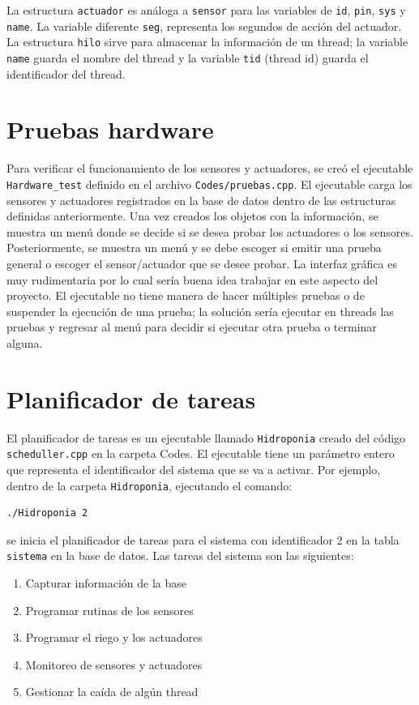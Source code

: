 \documentclass[a4paper,10pt,titlepage]{article}
\begin{document}
La estructura \verb|actuador| 
es an\'aloga a \verb|sensor| para las variables de \verb|id|, \verb|pin|, \verb|sys| y \verb|name|. La variable diferente \verb|seg|, representa los segundos de acci\'on 
del actuador. La estructura \verb|hilo| sirve para almacenar la informaci\'on de un thread; la variable \verb|name| guarda el nombre del thread y la variable \verb|tid| 
(thread id) guarda el identificador del thread.

\section{Pruebas hardware}
Para verificar el funcionamiento de los sensores y actuadores, se cre\'o el ejecutable \verb|Hardware_test| definido en el archivo \verb|Codes/pruebas.cpp|. El ejecutable 
carga 
los sensores y actuadores registrados en la base de datos dentro de las estructuras definidas anteriormente. Una vez creados los objetos con la informaci\'on, se muestra un 
men\'u donde se decide si se desea probar los actuadores o los sensores. 
Posteriormente, se muestra un men\'u y se debe escoger si emitir una prueba general o escoger el sensor/actuador que se desee probar. La interfaz gr\'afica es muy 
rudimentaria por lo cual ser\'ia buena idea trabajar en este aspecto del proyecto. El ejecutable no tiene manera de hacer m\'ultiples pruebas o de suspender la ejecuci\'on 
de una 
prueba; la soluci\'on ser\'ia ejecutar en threads las pruebas y 
regresar al men\'u para decidir si ejecutar otra prueba o terminar alguna.

\section{Planificador de tareas}
El planificador de tareas es un ejecutable llamado \verb|Hidroponia| creado del c\'odigo \verb|scheduller.cpp| en la carpeta Codes. El ejecutable tiene un par\'ametro 
entero que representa el identificador del sistema que se va a activar. Por ejemplo, dentro de la carpeta \verb|Hidroponia|, ejecutando el comando:

\begin{verbatim}
./Hidroponia 2
\end{verbatim}

se inicia el planificador de tareas para el sistema con identificador 2 en la tabla \verb|sistema| en la base de datos. Las tareas del sistema son las siguientes:

\begin{enumerate}  
	\item Capturar informaci\'on de la base 
	\item Programar rutinas de los sensores
	\item Programar el riego y los actuadores
	\item Monitoreo de sensores y actuadores
	\item Gestionar la ca\'ida de alg\'un thread
\end{enumerate}
\end{document}
